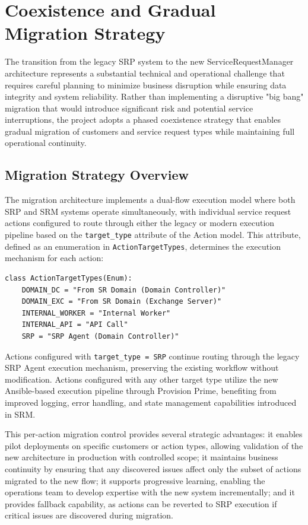 \chapter{Coexistence and Gradual Migration Strategy}

The transition from the legacy SRP system to the new ServiceRequestManager architecture represents a substantial technical and operational challenge that requires careful planning to minimize business disruption while ensuring data integrity and system reliability. Rather than implementing a disruptive "big bang" migration that would introduce significant risk and potential service interruptions, the project adopts a phased coexistence strategy that enables gradual migration of customers and service request types while maintaining full operational continuity.

\section{Migration Strategy Overview}

The migration architecture implements a dual-flow execution model where both SRP and SRM systems operate simultaneously, with individual service request actions configured to route through either the legacy or modern execution pipeline based on the \texttt{target\_type} attribute of the Action model. This attribute, defined as an enumeration in \texttt{ActionTargetTypes}, determines the execution mechanism for each action:

\begin{verbatim}
class ActionTargetTypes(Enum):
    DOMAIN_DC = "From SR Domain (Domain Controller)"
    DOMAIN_EXC = "From SR Domain (Exchange Server)"
    INTERNAL_WORKER = "Internal Worker"
    INTERNAL_API = "API Call"
    SRP = "SRP Agent (Domain Controller)"
\end{verbatim}

Actions configured with \texttt{target\_type = SRP} continue routing through the legacy SRP Agent execution mechanism, preserving the existing workflow without modification. Actions configured with any other target type utilize the new Ansible-based execution pipeline through Provision Prime, benefiting from improved logging, error handling, and state management capabilities introduced in SRM.

This per-action migration control provides several strategic advantages: it enables pilot deployments on specific customers or action types, allowing validation of the new architecture in production with controlled scope; it maintains business continuity by ensuring that any discovered issues affect only the subset of actions migrated to the new flow; it supports progressive learning, enabling the operations team to develop expertise with the new system incrementally; and it provides fallback capability, as actions can be reverted to SRP execution if critical issues are discovered during migration.

